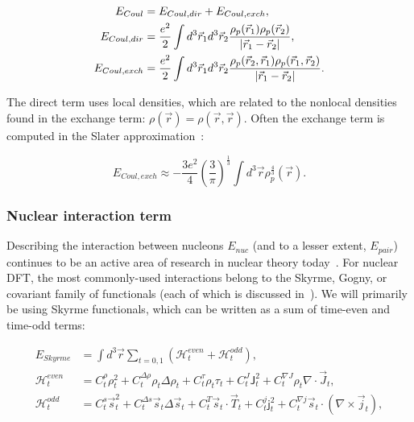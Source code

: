 \begin{align}
E_{Coul} &= E_{Coul, dir} + E_{Coul, exch}, \\
E_{Coul, dir}& = \frac{e^2}{2} \int d^3\vec{r}_1 d^3\vec{r}_2 \frac{\rho_p(\vec{r}_1)\rho_p(\vec{r}_2)}{\abs{\vec{r}_1-\vec{r}_2}}, \\
E_{Coul, exch} &= \frac{e^2}{2} \int d^3\vec{r}_1 d^3\vec{r}_2 \frac{\rho_p(\vec{r}_2,\vec{r}_1)\rho_p(\vec{r}_1,\vec{r}_2)}{\abs{\vec{r}_1-\vec{r}_2}}.
\end{align}

\noindent The direct term uses local densities, which are related to the nonlocal densities found in the exchange term: $\rho(\vec{r}) = \rho(\vec{r},\vec{r})$. Often the exchange term is computed in the Slater approximation~\cite{Slater1951, TitinSchnaider1974}:

\begin{equation}
E_{Coul, exch} \approx -\frac{3e^2}{4} \left(\frac{3}{\pi}\right)^\frac{1}{3} \int d^3\vec{r} \rho_p^\frac{4}{3}(\vec{r}).
\end{equation}

\subsubsection{Nuclear interaction term}\label{sect:skyrmeterm}
Describing the interaction between nucleons $E_{nuc}$ (and to a lesser extent, $E_{pair}$) continues to be an active area of research in nuclear theory today~\cite{Machleidt2011,Machleidt2016,Epelbaum2009,Detmold2015,Stroberg2019}. For nuclear DFT, the most commonly-used interactions belong to the Skyrme, Gogny, or covariant family of functionals (each of which is discussed in~\cite{bender2003}). We will primarily be using Skyrme functionals, which can be written as a sum of time-even and time-odd terms:

\begin{align}
E_{Skyrme} &= \int d^3\vec{r} \sum_{t=0,1} \left( \mathcal{H}^{even}_t + \mathcal{H}^{odd}_t \right),\\
\mathcal{H}^{even}_t &= C^\rho_t\rho_t^2 + C_t^{\Delta\rho}\rho_t\Delta\rho_t + C^\tau_t\rho_t\tau_t + C^J_t\mathsf{J}^2_t + C^{\nabla J}_t\rho_t\nabla\cdot\vec{J}_t, \\
\mathcal{H}^{odd}_t &= C^s_t \vec{s}_t^2 + C_t^{\Delta s}\vec{s}_t\Delta\vec{s}_t + C^T_t\vec{s}_t\cdot\vec{T}_t + C^j_t\mathsf{j}^2_t + C^{\nabla j}_t\vec{s}_t\cdot(\nabla\times\vec{j}_t),
\end{align}

